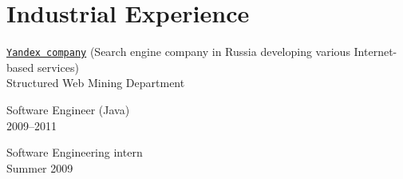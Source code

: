 \section{Industrial Experience}
\href{http://company.yandex.com/}{\tt Yandex company} (Search engine company in Russia developing various Internet-based services)\\
Structured Web Mining Department
\begin{innerlist}
\item Software Engineer (Java)\\
  2009--2011
\item Software Engineering intern\\
  Summer 2009
\end{innerlist}

